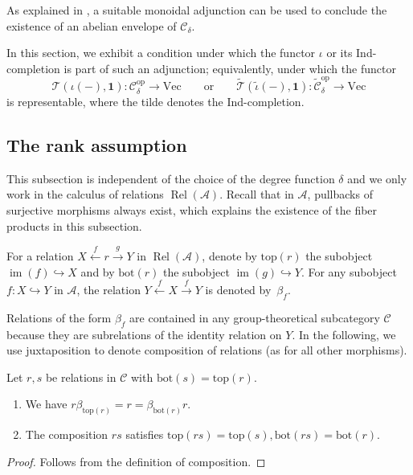 \documentclass[11pt]{amsart}
\newcommand\Cref[1]{\zcref[S]{#1}}
\theoremstyle{definition}
\theoremstyle{remark}
\newcommand\cA{\mathcal A}
\newcommand\cC{\mathcal C}
\newcommand\cT{\mathcal T}
\newcommand\im{\operatorname{im}}
\renewcommand\:\colon
\newcommand\one{\mathbf{1}}
\renewcommand\Vec{\mathrm{Vec}}
\renewcommand\:\colon
\newcommand\Rel{\operatorname{Rel}}
\newcommand\op{^{\mathrm{op}}}
\newcommand\topp{\mathrm{top}}
\newcommand\bott{\mathrm{bot}}
\begin{document}
As explained in \Cref{thm:adjoint-ab-env}, a suitable monoidal adjunction can be used to conclude the existence of an abelian envelope of $\cC_\delta$.

In this section, we exhibit a condition under which the functor $\iota$ or its Ind-completion is part of such an adjunction; equivalently, under which the functor
\[
    \cT(\iota(-), \one): \cC_\delta\op \to \Vec \qquad\text{or}\qquad \tilde{\cT}(\tilde{\iota}(-), \one): \tilde{\cC}_\delta\op \to \Vec
\]
is representable, where the tilde denotes the Ind-completion.

\subsection{The rank assumption}

This subsection is independent of the choice of the degree function $\delta$ and we only work in the calculus of relations $\Rel(\cA)$. Recall that in $\cA$, pullbacks of surjective morphisms always exist, which explains the existence of the fiber products in this subsection.

\begin{notation}
    For a relation $X \xleftarrow{f} r \xrightarrow{g} Y$ in $\Rel(\cA)$,
    denote by $\topp(r)$ the subobject $\im(f) \hookrightarrow X$ and by
    $\bott(r)$ the subobject $\im(g) \hookrightarrow Y$. For any subobject
    $f: X \hookrightarrow Y$ in $\cA$, the relation $Y \xleftarrow{f} X
    \xrightarrow{f} Y$ is denoted by~$\beta_f$.
\end{notation}

Relations of the form $\beta_f$ are contained in any group-theoretical subcategory $\cC$ because they are subrelations of the identity relation on $Y$. In the following, we use juxtaposition to denote composition of relations (as for all other morphisms).

\begin{lemma} \label{l:topp-bott-composition}
    Let $r,s$ be relations in $\cC$ with $\bott(s)=\topp(r)$.

    \begin{enumerate}
        \item[(a)] We have $r \beta_{\topp(r)} = r = \beta_{\bott(r)} r$.
        \item[(b)] The composition $rs$ satisfies $\topp(rs) = \topp(s), \bott(rs) = \bott(r)$.
    \end{enumerate}
\end{lemma}
\begin{proof}
    Follows from the definition of composition.
\end{proof}
\end{document}
